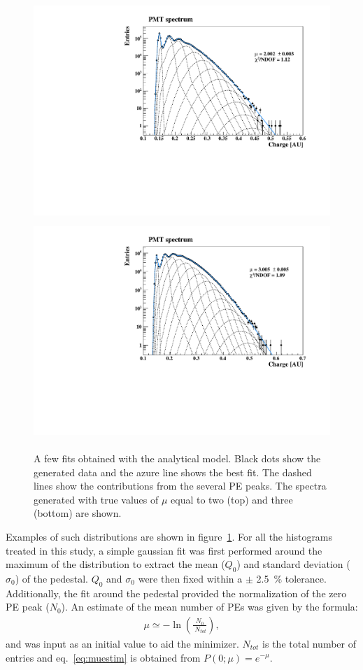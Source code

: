 \documentclass[preprint,12pt]{elsarticle}
\begin{document}
\begin{figure}[!t]
\centering
\includegraphics[width=12.0cm, height=8.20cm]{figures/mc-fit-2.pdf} \\
\includegraphics[width=12.0cm, height=8.20cm]{figures/mc-fit-3.pdf} \\
\caption{ A few fits obtained with the analytical model. 
Black dots show the generated data and the azure line shows the best fit. The dashed lines show the contributions from the several PE peaks. 
The spectra generated with true values of $\mu$ equal to two (top) and three (bottom) are shown. }
\label{fig:spes}
\end{figure}
Examples of such distributions are shown in figure~\ref{fig:spes}. 
For all the histograms treated in this study, a simple gaussian fit was first performed around the maximum of the distribution to extract the mean ($Q_0$) and standard deviation ($\sigma_0$) of the pedestal. 
$Q_0$ and $\sigma_0$ were then fixed within a $\pm$ 2.5~\% tolerance. 
Additionally, the fit around the pedestal provided the normalization of the zero PE peak ($N_0$). 
An estimate of the mean number of PEs was given by the formula: 
\begin{align}
\mu \simeq - \ln \left(  \frac{N_0}{\ N_{tot}} \right),  
\label{eq:muestim}
\end{align}
and was input as an initial value to aid the minimizer. 
$N_{tot}$ is the total number of entries and eq.~\eqref{eq:muestim} is obtained from $P(0; \mu ) = e^{-\mu}$. 
\end{document}
